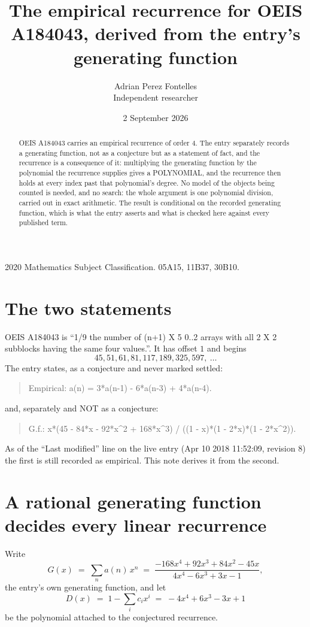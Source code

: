 \documentclass[11pt,a4paper]{article}
\title{The empirical recurrence for OEIS A184043, derived from the entry's generating function}
\author{Adrian Perez Fontelles\\ \small Independent researcher}
\date{2 September 2026}
\theoremstyle{plain}
\theoremstyle{definition}
\begin{document}
\maketitle

\begin{abstract}
OEIS A184043 carries an empirical recurrence of order $4$. The entry separately records a
generating function, not as a conjecture but as a statement of fact, and the recurrence is a
consequence of it: multiplying the generating function by the polynomial the recurrence
supplies gives a POLYNOMIAL, and the recurrence then holds at every index past that
polynomial's degree. No model of the objects being counted is needed, and no search: the
whole argument is one polynomial division, carried out in exact arithmetic. The result is
conditional on the recorded generating function, which is what the entry asserts and what is
checked here against every published term.
\end{abstract}

\noindent\small 2020 Mathematics Subject Classification. 05A15, 11B37, 30B10.\normalsize

\section{The two statements}

OEIS A184043 is ``1/9 the number of (n+1) X 5 0..2 arrays with all 2 X 2 subblocks having the same four values.''. It has offset $1$ and begins
\[
45, 51, 61, 81, 117, 189, 325, 597,\ \dots
\]
The entry states, as a conjecture and never marked settled:
\begin{quote}
Empirical: a(n) = 3*a(n-1) - 6*a(n-3) + 4*a(n-4).
\end{quote}
and, separately and NOT as a conjecture:
\begin{quote}
G.f.: x*(45 - 84*x - 92*x\^{}2 + 168*x\^{}3) / ((1 - x)*(1 - 2*x)*(1 - 2*x\^{}2)).
\end{quote}
As of the ``Last modified'' line on the live entry (Apr 10 2018 11:52:09, revision 8) the first is still
recorded as empirical. This note derives it from the second.

\section{A rational generating function decides every linear recurrence}

Write
\[
G(x)\;=\;\sum_{n}a(n)\,x^{n}\;=\;\frac{- 168 x^{4} + 92 x^{3} + 84 x^{2} - 45 x}{4 x^{4} - 6 x^{3} + 3 x - 1},
\]
the entry's own generating function, and let
\[
D(x)\;=\;1-\sum_i c_i x^{i}\;=\;- 4 x^{4} + 6 x^{3} - 3 x + 1
\]
be the polynomial attached to the conjectured recurrence.
\end{document}
